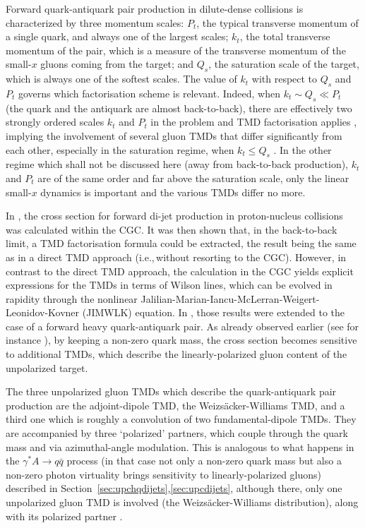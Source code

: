 \documentclass[../report.tex]{subfiles}
\begin{document}
Forward quark-antiquark pair production in dilute-dense collisions is characterized by three momentum scales: $P_{t}$, the typical transverse
momentum of a single quark, and always one of the largest scales; $k_{t}$, the total transverse momentum of the pair, which is a measure of the transverse momentum of the small-$x$ gluons coming from the target; and $Q_s$, the saturation scale of the target, which is always one of the softest scales.
The value of $k_{t}$ with respect to $Q_{s}$ and $P_{t}$ governs which factorisation scheme is relevant. Indeed, when $k_{t}\sim Q_{s}\ll P_{t}$ (the quark and the antiquark are almost back-to-back), there are effectively two strongly ordered scales $k_{t}$ and $P_{t}$ in the problem and TMD factorisation applies \cite{Dominguez:2011wm}, implying the involvement of several gluon TMDs that differ significantly from each other, especially in the saturation regime, when $k_t\leq Q_s$ \cite{Marquet:2016cgx}. In the other regime which shall not be discussed here (away from back-to-back production), $k_{t}$ and $P_{t}$ are of the same order and far above the saturation scale, only the linear small-$x$ dynamics is important and the various TMDs differ no more.

In \cite{Marquet:2007vb,Dominguez:2011wm}, the cross section for forward di-jet production in proton-nucleus collisions
was calculated within the CGC. It was then shown that, in the back-to-back limit, a TMD factorisation formula could
be extracted, the result being the same as in a direct TMD approach (i.e.,\,without resorting to the CGC). However, in contrast to the
direct TMD approach, the calculation in the CGC yields explicit expressions for the TMDs in terms of Wilson lines, which can be evolved in rapidity
through the nonlinear Jalilian-Marian-Iancu-McLerran-Weigert-Leonidov-Kovner (JIMWLK) equation. In \cite{Marquet:2017xwy}, those results
were extended to the case of a forward heavy quark-antiquark pair. As already observed earlier (see for instance \cite{Mulders:2000sh,Boer:2009nc,Boer:2010zf,Metz:2011wb,dominguez:2011br,Akcakaya:2012si}), by keeping a non-zero quark mass, the cross section becomes sensitive to additional TMDs, which describe the linearly-polarized gluon content of the unpolarized target.

The three unpolarized gluon TMDs which describe the quark-antiquark pair production are the adjoint-dipole TMD, the Weizs{\"a}cker-Williams TMD, and a third one which is roughly a convolution of two fundamental-dipole TMDs. They are accompanied by three \textquoteleft polarized' partners, which couple through the quark mass and via azimuthal-angle modulation. This is analogous to what happens in the $\gamma^*A\rightarrow q\bar{q}$ process (in that case not only a non-zero quark mass but also a non-zero photon virtuality brings sensitivity to linearly-polarized gluons) described in Section~\ref{sec:upchqdijets},\ref{sec:upcdijets}, although there, only one unpolarized gluon TMD is involved (the Weizs{\"a}cker-Williams distribution), along with its polarized partner \cite{Metz:2011wb,dominguez:2011br}. %
\end{document}
